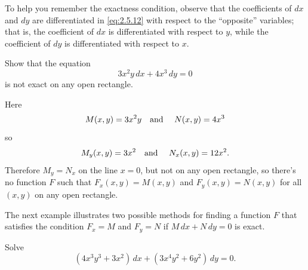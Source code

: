 \documentclass{ximera}
\begin{document}
To help you  remember the exactness condition, observe
that the coefficients of $dx$ and $dy$ are differentiated in
\eqref{eq:2.5.12} with respect to the ``opposite'' variables; that is,
the coefficient of $dx$ is differentiated with respect to $y$, while the
coefficient of $dy$ is differentiated with respect to $x$.

\begin{example}\label{example:2.5.2} \rm
 Show that the equation
$$
3x^2y\,dx+4x^3\,dy=0
$$
is not exact on any open rectangle.
\end{example}

\solution   Here
$$
M(x,y)=3x^2y\mbox{\quad and \quad} N(x,y)=4x^3
$$
so
$$
M_y(x,y)=3x^2 \mbox{\quad and \quad} N_x(x,y)=12 x^2.
$$
Therefore  $M_y=N_x$   on the line $x=0$,
but not on any open rectangle, so
there's no
function $F$ such that $F_x(x,y)=M(x,y)$ and $F_y(x,y)=N(x,y)$
for all $(x,y)$ on any open rectangle.
\bbox

The next example illustrates two possible methods for finding a
function $F$ that satisfies the condition $F_x=M$ and $F_y=N$ if
$M\,dx+N\,dy=0 $ is exact.

\begin{example}\label{example:2.5.3} \rm
Solve
\begin{equation} \label{eq:2.5.13}
(4x^3y^3+3x^2)\,dx+(3x^4y^2+6y^2)\,dy=0.
\end{equation}
\end{example}
\end{document}
